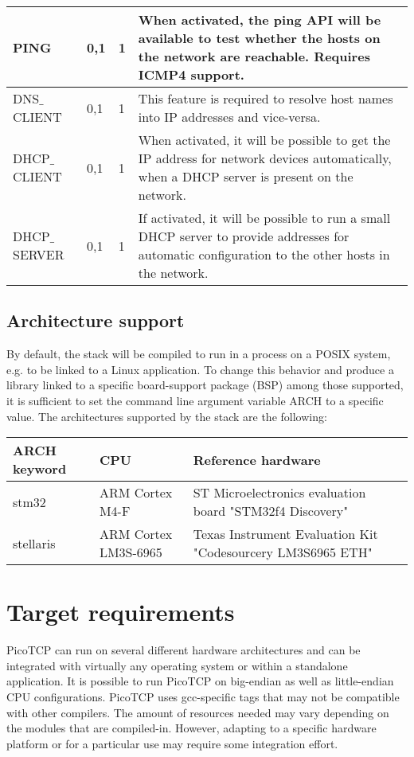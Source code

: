 \begin{longtable}{ | l | l | l | p{5cm} | }
PING&
0,1&
1&
When activated, the ping API will be available to test whether the hosts on the network are reachable.
Requires ICMP4 support.
\\ \hline

DNS$\_$CLIENT&
0,1&
1&
This feature is required to resolve host names into IP addresses and vice-versa.
\\ \hline

DHCP$\_$CLIENT&
0,1&
1&
When activated, it will be possible to get the IP address for network devices automatically, when a DHCP
server is present on the network.
\\ \hline

DHCP$\_$SERVER&
0,1&
1&
If activated, it will be possible to run a small DHCP server to provide addresses for automatic configuration
to the other hosts in the network.
\\ \hline

\end{longtable}

\subsection{Architecture support}
By default, the stack will be compiled to run in a process on a POSIX
system, e.g. to be linked to a Linux application. To change this behavior
and produce a library linked to a specific board-support package (BSP)
among those supported, it is sufficient to set the command line argument
variable ARCH to a specific value. The architectures supported by the stack
are the following:


\begin{longtable}{ | l | l | p{5cm} | }
\hline
{\bf ARCH keyword} &
{\bf CPU} &
{\bf Reference hardware}
\\ \hline

stm32&
ARM Cortex M4-F&
ST Microelectronics evaluation board "STM32f4 Discovery"
\\ \hline

stellaris&
ARM Cortex LM3S-6965&
Texas Instrument Evaluation Kit "Codesourcery LM3S6965 ETH"
\\ \hline

\end{longtable}



\section{Target requirements}
PicoTCP can run on several different hardware architectures and can be
integrated with virtually any operating system or within a standalone
application. It is possible to run PicoTCP on big-endian as well as
little-endian CPU configurations. PicoTCP uses gcc-specific tags that may
not be compatible with other compilers. The amount of resources needed
may vary depending on the modules that are compiled-in. However, adapting
to a specific hardware platform or for a particular use may require some
integration effort.

